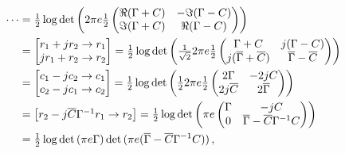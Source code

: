 \documentclass[a4paper,10pt]{article}
\newcommand{\conj}[1]{\overline{#1}}
\begin{document}
\begin{align}
\cdots
  &
  = \tfrac12 \log \det{\biggl(
    2 \pi e \tfrac12
    \begin{pmatrix}
      \Re{(\Gamma + C)} & - \Im{(\Gamma - C)} \\
      \Im{(\Gamma + C)} &   \Re{(\Gamma - C)}
    \end{pmatrix}
  \biggr)}
  \notag \\
  &
  = \begin{bmatrix}
    r_1 + j r_2 \to r_1 \\  %
    j r_1 + r_2 \to r_2     %
  \end{bmatrix}
  = \tfrac12 \log \det{\biggl(
    \tfrac1{\sqrt{2}} 2 \pi e \tfrac12
    \begin{pmatrix}
      \Gamma + C & j (\Gamma - C) \\
      j (\conj{\Gamma} + \conj{C}) & \conj{\Gamma} - \conj{C}
    \end{pmatrix}
  \biggr)}
  \notag \\
  &
  = \begin{bmatrix}
    c_1 - j c_2 \to c_1 \\  %
    c_2 - j c_1 \to c_2     %
  \end{bmatrix}
  = \tfrac12 \log \det{\biggl(
    \tfrac12 2 \pi e \tfrac12
    \begin{pmatrix}
      2 \Gamma     & - 2 j C \\
      2 j \conj{C} & 2 \conj{\Gamma}
    \end{pmatrix}
  \biggr)}
  \notag \\
  &
  = \begin{bmatrix}
    r_2 - j \conj{C} \Gamma^{-1} r_1 \to r_2
  \end{bmatrix}
  = \tfrac12 \log \det{\biggl(
    \pi e
    \begin{pmatrix}
      \Gamma & - j C \\
      0 & \conj{\Gamma} - \conj{C} \Gamma^{-1} C
    \end{pmatrix}
  \biggr)}
  \notag \\
  &
  = \tfrac12 \log \det{(\pi e \Gamma)} \det{(\pi e (\conj{\Gamma} - \conj{C} \Gamma^{-1} C))}
  \,,
\end{align}
\end{document}

